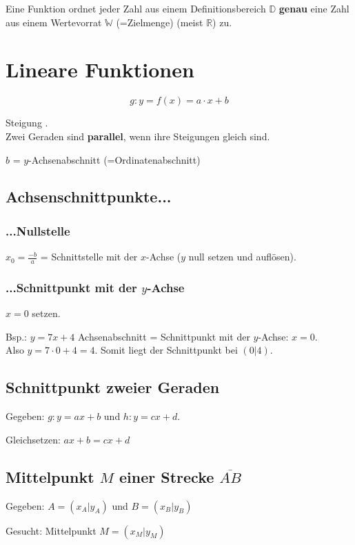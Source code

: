 \begin{multicols}{2}
Eine Funktion ordnet jeder Zahl aus einem Definitionsbereich
$\mathbb{D}$ \textbf{genau} eine Zahl aus einem Wertevorrat
$\mathbb{W}$ (=Zielmenge) (meist $\mathbb{R}$) zu.

\hrulefill
\section*{Lineare Funktionen}

$$g: y = f(x) = a\cdot{}x + b$$

Steigung .\\
Zwei Geraden sind \textbf{parallel}, wenn ihre Steigungen gleich sind.

$b$ = $y$-Achsenabschnitt (=Ordinatenabschnitt)

\subsection*{Achsenschnittpunkte...}
\subsubsection*{...Nullstelle} $x_0 = \frac{-b}{a}$ = Schnittstelle mit der $x$-Achse ($y$ null setzen und auf\/lösen).

\subsubsection*{...Schnittpunkt mit der $y$-Achse}
$x=0$ setzen.

Bsp.: $y=7x+4$ Achsenabschnitt = Schnittpunkt mit der $y$-Achse:
$x=0$.\\
Also $y=7\cdot{}0 + 4 = 4$. Somit liegt der Schnittpunkt bei $(0|4)$.


\subsection*{Schnittpunkt zweier Geraden}
Gegeben: $g: y=ax+b$ und $h: y=cx+d$.

Gleichsetzen: $ax+b = cx+d$


\subsection*{Mittelpunkt $M$ einer Strecke $\overline{AB}$}
Gegeben: $A=(x_A|y_A)$ und $B=(x_B|y_B)$

Gesucht: Mittelpunkt $M=(x_M|y_M)$


\end{multicols}
